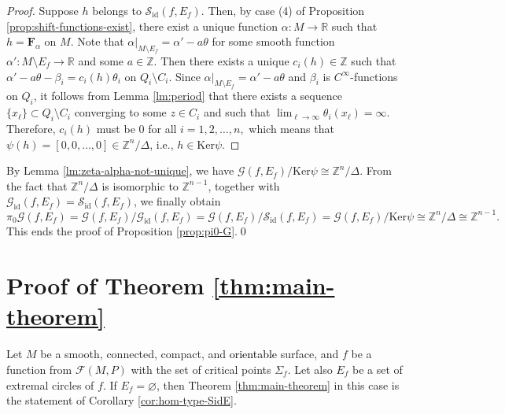 \documentclass[10pt,reqno]{amsart}
\newcommand{\bbR}{\mathbb{R}}
\newcommand{\bbZ}{\mathbb{Z}}
\newcommand{\bfF}{\mathbf{F}}
\newcommand{\F}{\mathcal{F}(M,P)}
\newcommand{\id}{\mathrm{id}}
\newcommand{\Crit}{\Sigma_f}
\renewcommand{\ker}{\mathrm{Ker}}
\newcommand{\textr}[1]{\textcolor{black}{#1}}
\begin{document}
\begin{proof}
Suppose $h$ belongs to $\mathcal{S}_{\id}(f,E_f)$. Then, by case (4) of Proposition \ref{prop:shift-functions-exist}, there exist a unique function $\alpha:M\to \bbR$ such that $h = \bfF_{\alpha}$ on $M$.
 Note that $\alpha|_{M\setminus E_f} = \alpha'-a\theta$ for some smooth function $\alpha':M\setminus E_f\to \bbR$ and some $a\in \bbZ$. Then there exists a unique $c_i(h)\in\bbZ$ such that $\alpha' -a\theta-\beta_i = c_i(h)\theta_i$ on $Q_i\setminus C_i$.
Since $\alpha|_{M\setminus E_f} = \alpha'-a\theta$ and $\beta_i$ is $C^{\infty}$-functions on $Q_i$, it follows from Lemma \ref{lm:period} that there exists a sequence $\{x_{\ell}\}\subset Q_i\setminus C_i$ converging to some $ z\in C_i$ and such that $\lim_{\ell\to \infty}\theta_i(x_{\ell}) = \infty$. Therefore, $c_i(h)$ must be $0$ for all $i = 1,2,\ldots, n,$ which means that $\psi(h) = [0,0,\ldots, 0]\in \bbZ^n/\Delta$, i.e., $h\in \ker \psi.$   
\end{proof}
By Lemma \ref{lm:zeta-alpha-not-unique}, we have $\mathcal{G}(f,E_f)/\ker \psi\cong \bbZ^n/\Delta$. 
From the fact that 
$\bbZ^n/\Delta$ is isomorphic to $\bbZ^{n-1}$, together with
  $\mathcal{G}_{\id}(f, E_f) = \mathcal{S}_{\id}(f,E_f)$, we finally  obtain
$$
\pi_0\mathcal{G}(f, E_f) =  \mathcal{G}(f, E_f)/\mathcal{G}_{\id}(f, E_f)  = \mathcal{G}(f, E_f)/\mathcal{S}_{\id}(f,E_f) = \mathcal{G}(f, E_f)/\ker\psi\cong \bbZ^n/\Delta\cong \bbZ^{n-1}.
$$
This ends the proof of Proposition \ref{prop:pi0-G}.\qed



\section{Proof of Theorem \ref{thm:main-theorem}}\label{sec:proof-main}
Let $M$ be a smooth, connected, compact, and \textr{orientable} surface, and $f$ be a function from $\F$ with the set of critical points $\Crit$. Let also $E_f$ be a set of extremal circles of $f$.  
If $E_f=\varnothing$, then Theorem   \ref{thm:main-theorem} in this case 
is the statement of 
Corollary \ref{cor:hom-type-SidE}.
\end{document}
